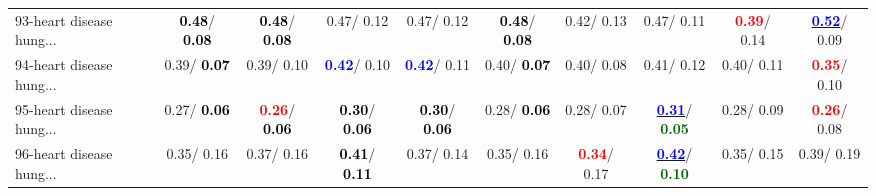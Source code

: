 \begin{table}[h]
\begin{center}
{\begin{tabular}{lc|c|c|c|c|c|c|c|c}
93-heart disease hung... & \textcolor{black}{\textbf{  0.48}}/\textcolor{black}{\textbf{  0.08}} & \textcolor{black}{\textbf{  0.48}}/\textcolor{black}{\textbf{  0.08}} &   0.47/  0.12 &   0.47/  0.12 & \textcolor{black}{\textbf{  0.48}}/\textcolor{black}{\textbf{  0.08}} &   0.42/  0.13 &   0.47/  0.11 & \textcolor{red}{\textbf{  0.39}}/  0.14 & \underline{\textcolor{blue}{\textbf{  0.52}}}/  0.09 \\
94-heart disease hung... &   0.39/\textcolor{black}{\textbf{  0.07}} &   0.39/  0.10 & \textcolor{blue}{\textbf{  0.42}}/  0.10 & \textcolor{blue}{\textbf{  0.42}}/  0.11 &   0.40/\textcolor{black}{\textbf{  0.07}} &   0.40/  0.08 &   0.41/  0.12 &   0.40/  0.11 & \textcolor{red}{\textbf{  0.35}}/  0.10 \\
95-heart disease hung... &   0.27/\textcolor{black}{\textbf{  0.06}} & \textcolor{red}{\textbf{  0.26}}/\textcolor{black}{\textbf{  0.06}} & \textcolor{black}{\textbf{  0.30}}/\textcolor{black}{\textbf{  0.06}} & \textcolor{black}{\textbf{  0.30}}/\textcolor{black}{\textbf{  0.06}} &   0.28/\textcolor{black}{\textbf{  0.06}} &   0.28/  0.07 & \underline{\textcolor{blue}{\textbf{  0.31}}}/\textcolor{darkgreen}{\textbf{  0.05}} &   0.28/  0.09 & \textcolor{red}{\textbf{  0.26}}/  0.08 \\
96-heart disease hung... &   0.35/  0.16 &   0.37/  0.16 & \textcolor{black}{\textbf{  0.41}}/\textcolor{black}{\textbf{  0.11}} &   0.37/  0.14 &   0.35/  0.16 & \textcolor{red}{\textbf{  0.34}}/  0.17 & \underline{\textcolor{blue}{\textbf{  0.42}}}/\textcolor{darkgreen}{\textbf{  0.10}} &   0.35/  0.15 &   0.39/  0.19 \\\end{tabular}}\label{stratsALCKappa2AllRedux50a}
\end{center}
\end{table}
